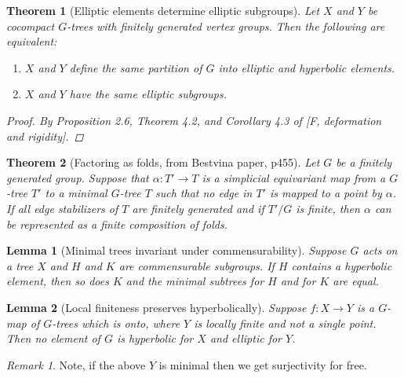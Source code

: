 \documentclass{article}
\theoremstyle{mystyle}
\newtheorem{thm}{Theorem}[section]
\newtheorem{lem}{Lemma}[section]
\theoremstyle{remark}
\newtheorem{rmk}{Remark}[section]
\begin{document}
\begin{thm}
    [Elliptic elements determine elliptic subgroups]
    \label{thm:ellelesubgroups} 
    Let \(X\) and \(Y\) be cocompact \(G\)-trees with finitely generated vertex groups. Then the following are equivalent:
    \begin{enumerate}
        \item \(X\) and \(Y\) define the same partition of \(G\) into elliptic and hyperbolic elements.
        \item \(X\) and \(Y\) have the same elliptic subgroups.
    \end{enumerate}

    \begin{proof}
    By Proposition 2.6, Theorem 4.2, and Corollary 4.3 of [F, deformation and rigidity].
    \end{proof}
    
\end{thm}

\begin{thm}[Factoring as folds, from Bestvina paper, p455]
    \label{thm:folds} 
Let $G$ be a finitely generated group. Suppose that $\alpha: T'\to T$ is a simplicial equivariant map from a $G$-tree $T'$ to a minimal $G$-tree $T$ such that no edge in $T'$ is mapped to a point by $\alpha$. If all edge stabilizers of $T$ are finitely generated and if $T'/G$ is finite, then $\alpha$ can be represented as a finite composition of folds.
\end{thm}

\begin{lem}
    [Minimal trees invariant under commensurability]
    \label{lem:commensurableminimal} 
    Suppose \(G\) acts on a tree \(X\) and \(H\) and \(K\) are commensurable subgroups. If \(H\) contains a hyperbolic element, then so does \(K\) and the minimal subtrees for \(H\) and for \(K\) are equal.
\end{lem}

\begin{lem}
    [Local finiteness preserves hyperbolically]
    \label{lem:localfinhyper} 
    Suppose \(f:X \to Y\) is a \(G\)-map of \(G\)-trees which is onto, where \(Y\) is locally finite and not a single point. Then no element of \(G\) is hyperbolic for \(X\) and elliptic for \(Y\).
\end{lem}

\begin{rmk}
    Note, if the above \(Y\) is minimal then we get surjectivity for free.
\end{rmk}
\end{document}
